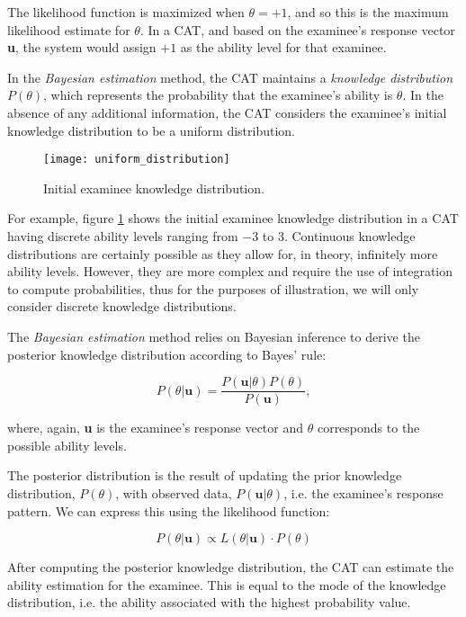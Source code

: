 The likelihood function is maximized when $\theta = +1$, and so this is the maximum likelihood estimate for $\theta$. In a CAT, and based on the examinee's response vector \textbf{u}, the system would assign $+1$ as the ability level for that examinee.\newline

In the \textit{Bayesian estimation} method, the CAT maintains a \textit{knowledge distribution} $P(\theta)$, which represents the probability that the examinee's ability is $\theta$. In the absence of any additional information, the CAT considers the examinee's initial knowledge distribution to be a uniform distribution.

\begin{figure}[H]
\centering
\texttt{[image: uniform\_distribution]}
\caption{Initial examinee knowledge distribution.}
\label{fig:uniform_distribution}
\end{figure}

For example, figure \ref{fig:uniform_distribution} shows the initial examinee knowledge distribution in a CAT having discrete ability levels ranging from $-3$ to $3$. Continuous knowledge distributions are certainly possible as they allow for, in theory, infinitely more ability levels. However, they are more complex and require the use of integration to compute probabilities, thus for the purposes of illustration, we will only consider discrete knowledge distributions. \newline

The \textit{Bayesian estimation} method relies on Bayesian inference to derive the posterior knowledge distribution according to Bayes' rule:

$$P(\theta | \textbf{u}) = \dfrac{P(\textbf{u} | \theta)P(\theta)}{P(\textbf{u})} ,$$

where, again, \textbf{u} is the examinee's response vector and $\theta$ corresponds to the possible ability levels.\newline

The posterior distribution is the result of updating the prior knowledge distribution, $P(\theta)$, with observed data, $P(\textbf{u} | \theta)$, i.e. the examinee's response pattern. We can express this using the likelihood function:

$$P(\theta | \textbf{u}) \propto L(\theta | \textbf{u}) \cdot P(\theta)$$

After computing the posterior knowledge distribution, the CAT can estimate the ability estimation for the examinee. This is equal to the mode of the knowledge distribution, i.e. the ability associated with the highest probability value.

